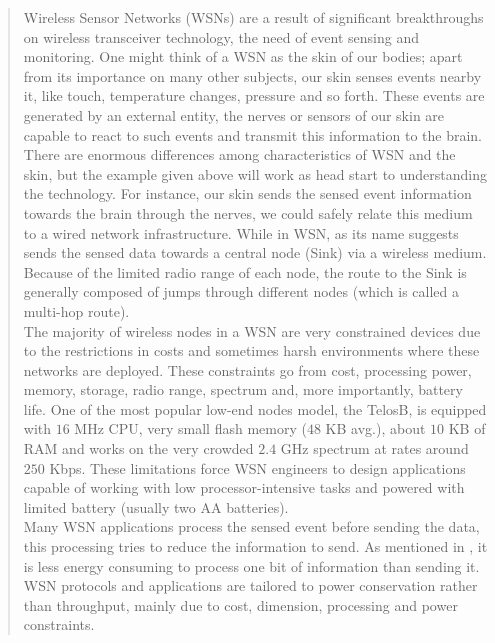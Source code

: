 \begin{quotation}
Wireless Sensor Networks (WSNs) are a result of significant breakthroughs on wireless transceiver technology, the need of event sensing and monitoring. One might think of a WSN as the skin of our bodies; apart from its importance on many other subjects, our skin senses events nearby it, like touch, temperature changes, pressure and so forth. These events are generated by an external entity, the nerves or sensors of our skin are capable to react to such events and transmit this information to the brain. \\

There are enormous differences among characteristics of WSN and the skin, but the example given above will work as head start to understanding the technology. For instance, our skin sends the sensed event information towards the brain through the nerves, we could safely relate this medium to a wired network infrastructure. While in WSN, as its name suggests sends the sensed data towards a central node (Sink) via a wireless medium. Because of the limited radio range of each node, the route to the Sink is generally composed of jumps through different nodes (which is called a multi-hop route).\\

The majority of wireless nodes in a WSN are very constrained devices due to the restrictions in costs and sometimes harsh environments where these networks are deployed. These constraints go from cost, processing power, memory, storage, radio range, spectrum and, more importantly, battery life. One of the most popular low-end nodes model, the TelosB, is equipped with $16$ MHz CPU, very small flash memory ($48$ KB avg.), about $10$ KB of RAM and works on the very crowded $2.4$ GHz spectrum at rates around $250$ Kbps. These limitations force WSN engineers to design applications capable of working with low processor-intensive tasks and powered with limited battery (usually two AA batteries).\\

Many WSN applications process the sensed event before sending the data, this processing tries to reduce the information to send. As mentioned in \cite{akyildiz2010wireless}, it is less energy consuming to process one bit of information than sending it. WSN protocols and applications are tailored to power conservation rather than throughput, mainly due to cost, dimension, processing and power constraints.\\


\end{quotation}
